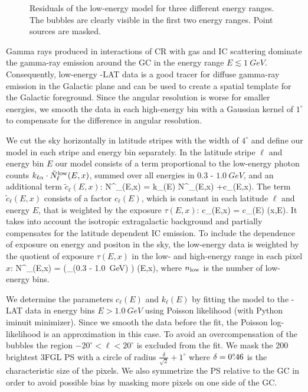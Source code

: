 \begin{figure}[t]
{\begin{subfigure}{0.3\textwidth}
    	\end{subfigure}
    }
  	\caption{Residuals of the low-energy model for three different energy ranges. The \Fermi bubbles are clearly visible in the first two energy ranges. Point sources are masked.}
  	\label{fig:Maps_lowE}
\end{figure}

Gamma rays produced in interactions of CR with gas and IC scattering dominate the gamma-ray emission around the GC in the energy range $E \lesssim \SI{1}{GeV}$. 
Consequently, low-energy \Fermi-LAT data is a good tracer for diffuse gamma-ray emission in the Galactic plane and can be used to create a spatial template for the Galactic foreground.
Since the angular resolution is worse for smaller energies, we smooth the data in each high-energy bin with a Gaussian kernel of $1^\circ$ to compensate for the difference in angular resolution. 

We cut the sky horizontally in latitude stripes with the width of $4^\circ$ and define our model in each stripe and energy bin separately. 
In the latitude stripe $\ell$ and energy bin $E$ our model consists of a term proportional to the low-energy photon counts $k_{\ell\alpha} \cdot \tilde N^{\text{low}}_\ell(E,x)$, summed over all energies in 0.3 - $\SI{1.0}{GeV}$, and an additional term $\tilde c_{\ell}(E,x)$: 
\be
N^\model_{\ell}(E,x) = k_{\ell}(E) \cdot \tilde N^\low_{\ell}(E,x) +\tilde c_{\ell}(E,x).
\ee
The term $\tilde c_\ell(E,x)$ consists of a factor $c_\ell(E)$, which is constant in each latitude $\ell$ and energy $E$, that is weighted by the exposure $\tau(E,x)$:
\be
\tilde c_\ell(E,x) = c_\ell(E) \cdot \tau(x,E).
\ee
It takes into account the isotropic extragalactic background and partially compensates for the latitude dependent IC emission. To include the dependence of exposure on energy and positon in the sky, the low-energy data is weighted by the quotient of exposure $\tau(E,x)$ in the low- and high-energy range in each pixel $x$:
\be
\tilde N^\model_\ell(E,x) =  \left(\sum_{\epsilon \in (0.3 - \SI{1.0}{GeV})} \right) \cdot \tau(E,x),
\ee
where $n_{\text{low}}$ is the number of low-energy bins. 


We determine the parameters $c_{\ell}(E)$ and $k_{\ell}(E)$ by fitting the model to the \Fermi-LAT data in energy bins $E > \SI{1.0}{GeV}$
using Poisson likelihood (with Python iminuit minimizer). Since we smooth the data before the fit, the Poisson log-likelihood is an approximation in this case. To avoid an overcompensation of the \Fermi bubbles the region $-20^\circ < \ell < 20^\circ$ is excluded from the fit. 
We mask the 200 brightest 3FGL PS  with a circle of radius $\frac{\delta}{\sqrt{2}} + 1^\circ$ where $\delta = 0^\circ\!\!.46$ is the characteristic size of the pixels. 
We also symmetrize the PS relative to the GC in order to avoid possible bias by masking more pixels on one side of the GC.

